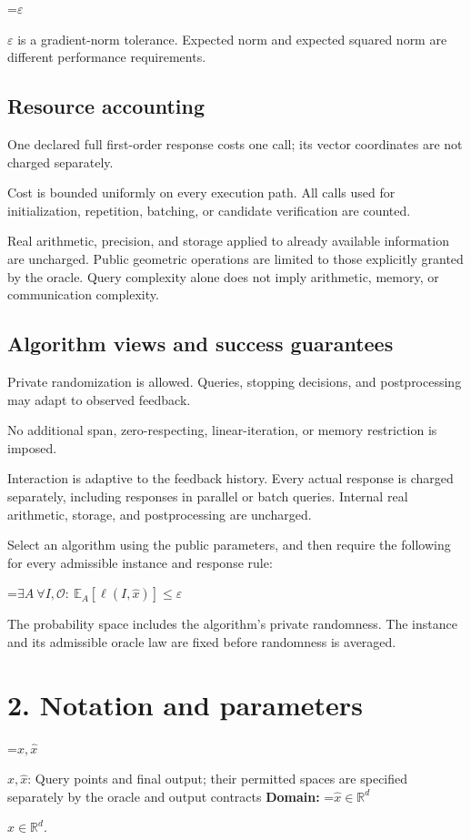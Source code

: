 \documentclass[10pt,a4paper]{article}
\newcommand{\AtlasMath}[1]{\par\begingroup\centering\setbox0=\hbox{$\displaystyle #1$}\ifdim\wd0>1.4\linewidth\typeout{ATLAS WIDE FORMULA: \the\wd0}\fi\ifdim\wd0>\linewidth\resizebox{\linewidth}{!}{\box0}\else\box0\fi\par\endgroup}
\newcommand{\AtlasInlineMath}[1]{\begingroup\setbox0=\hbox{$#1$}\ifdim\wd0>.4\linewidth\endgroup\AtlasMath{#1}\else\endgroup$#1$\fi}
\begin{document}
\AtlasInlineMath{\varepsilon} is a gradient-norm tolerance. Expected norm and expected squared norm are different performance requirements.

\subsection{Resource accounting}
One declared full first-order response costs one call; its vector coordinates are not charged separately.

Cost is bounded uniformly on every execution path. All calls used for initialization, repetition, batching, or candidate verification are counted.

Real arithmetic, precision, and storage applied to already available information are uncharged. Public geometric operations are limited to those explicitly granted by the oracle. Query complexity alone does not imply arithmetic, memory, or communication complexity.

\subsection{Algorithm views and success guarantees}
Private randomization is allowed. Queries, stopping decisions, and postprocessing may adapt to observed feedback.

No additional span, zero-respecting, linear-iteration, or memory restriction is imposed.

Interaction is adaptive to the feedback history. Every actual response is charged separately, including responses in parallel or batch queries. Internal real arithmetic, storage, and postprocessing are uncharged.

Select an algorithm using the public parameters, and then require the following for every admissible instance and response rule:


\AtlasMath{\exists A\ \forall I,\mathcal{O}:\ \mathbb{E}_A[\ell(I,\widehat{x})]\le\varepsilon}


The probability space includes the algorithm's private randomness. The instance and its admissible oracle law are fixed before randomness is averaged.

\section{2. Notation and parameters}
\AtlasInlineMath{x,\widehat{x}}: Query points and final output; their permitted spaces are specified separately by the oracle and output contracts \textbf{Domain:} \AtlasInlineMath{\widehat{x}\in \mathbb{R}^d}.
\end{document}
